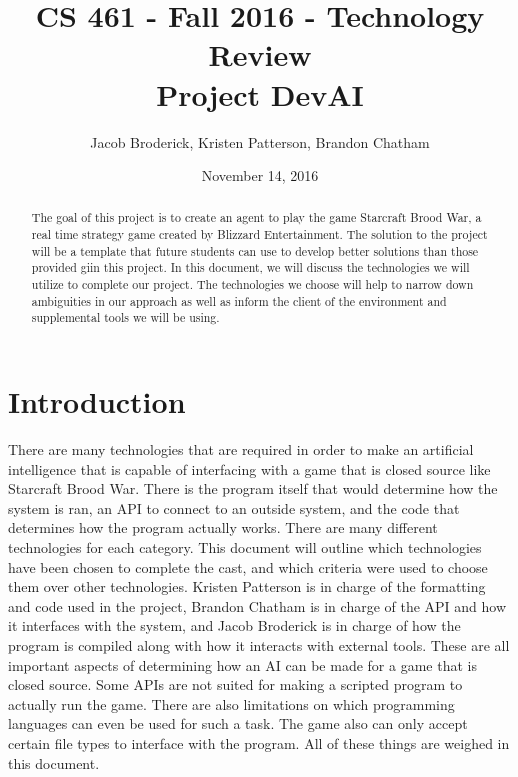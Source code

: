 \documentclass[10pt,letterpaper,onecolumn,draftclsnofoot]{IEEEtran}
\begin{document}
\begin{titlepage}

  \title{CS 461 - Fall 2016 - Technology Review \\ Project DevAI}
  \author{Jacob Broderick, Kristen Patterson, Brandon Chatham}
  \date{November 14, 2016}
  \maketitle
  \vspace{4cm}
  \begin{abstract}
  	\noindent 
  	  	\noindent
	The goal of this project is to create an agent to play the game Starcraft Brood War, a real time strategy game created by Blizzard Entertainment. The solution to the project will be a template that future students can use to develop better solutions than those provided giin this project. In this document, we will discuss the technologies we will utilize to complete our project. The technologies we choose will help to narrow down ambiguities in our approach as well as inform the client of the environment and supplemental tools we will be using.
   \end{abstract}
\end{titlepage}

\tableofcontents

\newpage

\section{Introduction}
There are many technologies that are required in order to make an artificial intelligence that is capable of interfacing with a game that is closed source like Starcraft Brood War. There is the program itself that would determine how the system is ran, an API to connect to an outside system, and the code that determines how the program actually works. There are many different technologies for each category. This document will outline which technologies have been chosen to complete the cast, and which criteria were used to choose them over other technologies. Kristen Patterson is in charge of the formatting and code used in the project, Brandon Chatham is in charge of the API and how it interfaces with the system, and Jacob Broderick is in charge of how the program is compiled along with how it interacts with external tools. These are all important aspects of determining how an AI can be made for a game that is closed source. Some APIs are not suited for making a scripted program to actually run the game. There are also limitations on which programming languages can even be used for such a task. The game also can only accept certain file types to interface with the program. All of these things are weighed in this document.
\end{document}
